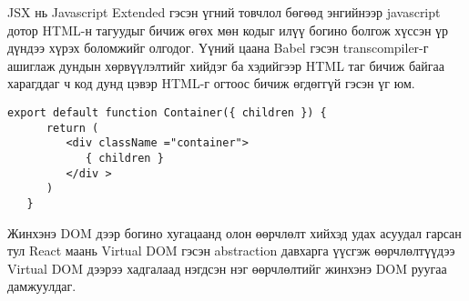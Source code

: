 JSX нь Javascript Extended гэсэн үгний товчлол бөгөөд энгийнээр javascript дотор HTML-н тагуудыг бичиж өгөх мөн кодыг илүү богино болгож хүссэн үр дүндээ хүрэх боломжийг олгодог. Үүний цаана Babel гэсэн transcompiler-г ашиглаж дундын хөрвүүлэлтийг хийдэг ба хэдийгээр HTML таг бичиж байгаа харагддаг ч код дунд цэвэр HTML-г огтоос бичиж өгдөггүй гэсэн үг юм.

\begin{lstlisting}[caption=JSX ашиглаж ”container” класстай html элемент буцаах компонент, frame=single]
   export default function Container({ children }) {
      return (
         <div className ="container">
            { children }
         </div >
      )
   }
\end{lstlisting}

Жинхэнэ DOM дээр богино хугацаанд олон өөрчлөлт хийхэд удах асуудал гарсан тул React маань Virtual DOM гэсэн abstraction давхарга үүсгэж өөрчлөлтүүдээ Virtual DOM дээрээ хадгалаад нэгдсэн нэг өөрчлөлтийг жинхэнэ DOM руугаа дамжуулдаг.